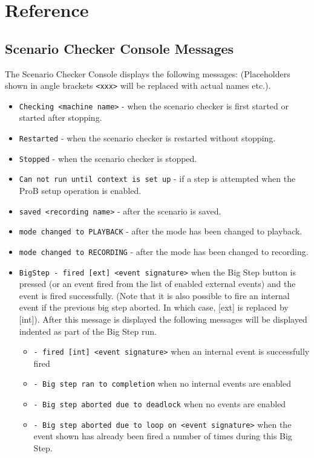 \section{Reference}
\label{sec:reference}

\subsection{Scenario Checker Console Messages}
\label{sec:consoleMessages}

The Scenario Checker Console displays the following messages:
(Placeholders shown in angle brackets \texttt{<xxx>} will be replaced with actual names etc.).
\begin{itemize}
	\item \texttt{Checking <machine name>} - when the scenario checker is first started or started after stopping.
	\item \texttt{Restarted} - when the scenario checker is restarted without stopping.
	\item \texttt{Stopped} - when the scenario checker is stopped.
	\item \texttt{Can not run until context is set up} - if a step is attempted when the ProB setup operation is enabled.
	\item \texttt{saved <recording name>} - after the scenario is saved.
	\item \texttt{mode changed to PLAYBACK} - after the mode has been changed to playback.
	\item \texttt{mode changed to RECORDING} - after the mode has been changed to recording.
	\item \texttt{BigStep - fired [ext] <event signature>} when the Big Step button is pressed (or an event fired from the list of enabled external events) and the event is fired successfully. (Note that it is also possible to fire an internal event if the previous big step aborted. In which case, [ext] is replaced by [int]). After this message is displayed the following messages will be displayed indented as part of the Big Step run.
	\begin{itemize}
		\item \texttt{- fired [int] <event signature>} when an internal event is successfully fired
		\item \texttt{- Big step ran to completion} when no internal events are enabled	
		\item \texttt{- Big step aborted due to deadlock} when no events are enabled
		\item \texttt{- Big step aborted due to loop on <event signature>} when the event shown has already been fired a number of times during this Big Step.	

\end{itemize}
\end{itemize}
